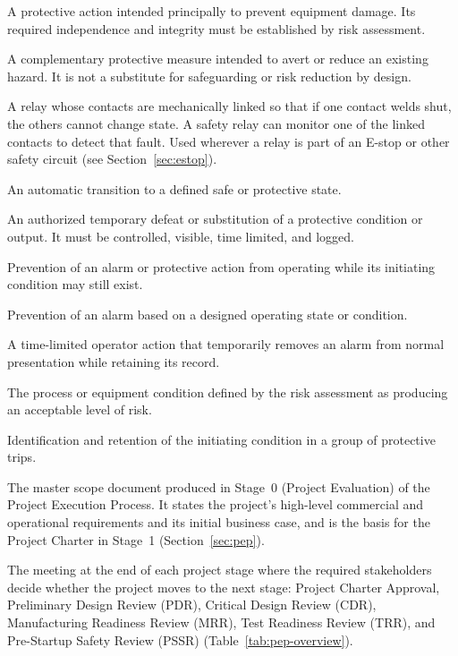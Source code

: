 \begin{description}[style=nextline,leftmargin=0pt]
  \item[Equipment protective interlock] A protective action intended principally to prevent equipment damage. Its required independence and integrity must be established by risk assessment.
  \item[Emergency-stop function] A complementary protective measure intended to avert or reduce an existing hazard. It is not a substitute for safeguarding or risk reduction by design.
  \item[Force-Guided Relay (FGR)] A relay whose contacts are mechanically linked so that if one contact welds shut, the others cannot change state. A safety relay can monitor one of the linked contacts to detect that fault. Used wherever a relay is part of an E-stop or other safety circuit (see Section~\ref{sec:estop}).
  \item[Trip] An automatic transition to a defined safe or protective state.
  \item[Bypass/Override] An authorized temporary defeat or substitution of a protective condition or output. It must be controlled, visible, time limited, and logged.
  \item[Inhibit] Prevention of an alarm or protective action from operating while its initiating condition may still exist.
  \item[Suppression] Prevention of an alarm based on a designed operating state or condition.
  \item[Shelving] A time-limited operator action that temporarily removes an alarm from normal presentation while retaining its record.
  \item[Safe state] The process or equipment condition defined by the risk assessment as producing an acceptable level of risk.
  \item[First-out] Identification and retention of the initiating condition in a group of protective trips.
  \item[Project Objective Document (POD)] The master scope document produced in Stage~0 (Project Evaluation) of the Project Execution Process. It states the project's high-level commercial and operational requirements and its initial business case, and is the basis for the Project Charter in Stage~1 (Section~\ref{sec:pep}).
  \item[Gate review] The meeting at the end of each project stage where the required stakeholders decide whether the project moves to the next stage: Project Charter Approval, Preliminary Design Review (PDR), Critical Design Review (CDR), Manufacturing Readiness Review (MRR), Test Readiness Review (TRR), and Pre-Startup Safety Review (PSSR) (Table~\ref{tab:pep-overview}).

\end{description}
